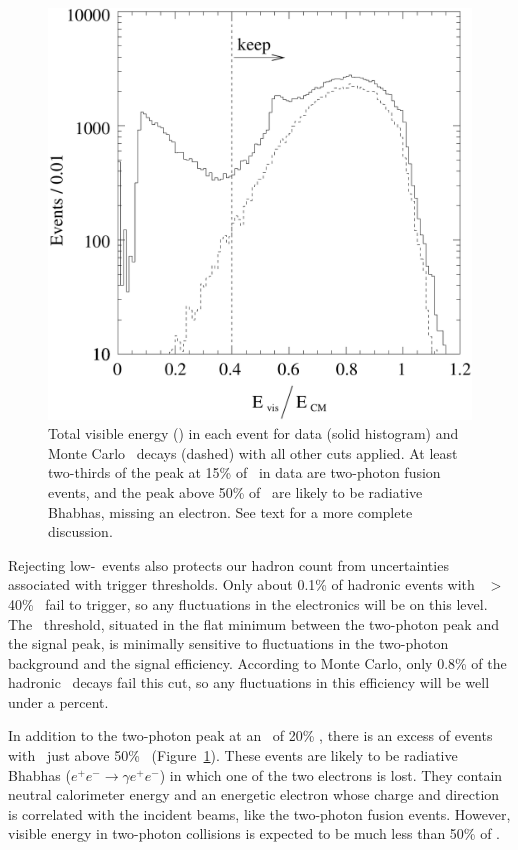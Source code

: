 \documentclass{cornell}
\begin{document}
\begin{figure}[p]
  \begin{center}
    \includegraphics[width=\linewidth]{plots/visen}
  \end{center}
  \caption{\label{visen} Total visible energy (\visen) in each event
  for data (solid histogram) and Monte Carlo \ups\ decays (dashed)
  with all other cuts applied.  At least two-thirds of the peak at
  15\% of \ecm\ in data are two-photon fusion events, and the peak
  above 50\% of \ecm\ are likely to be radiative Bhabhas, missing an
  electron.  See text for a more complete discussion.}
\end{figure}

Rejecting low-\visen\ events also protects our hadron count from
uncertainties associated with trigger thresholds.  Only about 0.1\% of
hadronic events with \visen\ $>$ 40\% \ecm\ fail to trigger, so any
fluctuations in the electronics will be on this level.  The \visen\
threshold, situated in the flat minimum between the two-photon peak
and the signal peak, is minimally sensitive to fluctuations in the
two-photon background and the signal efficiency.  According to Monte
Carlo, only 0.8\% of the hadronic \ups\ decays fail this cut, so any
fluctuations in this efficiency will be well under a percent.

In addition to the two-photon peak at an \visen\ of 20\% \ecm, there
is an excess of events with \visen\ just above 50\% \ecm\ (Figure~\ref{visen}).  These events are likely to be radiative Bhabhas
($e^+e^- \to \gamma e^+e^-$) in which one of the two electrons is
lost.  They contain neutral calorimeter energy and an energetic
electron whose charge and direction is correlated with the incident
beams, like the two-photon fusion events.  However, visible energy in
two-photon collisions is expected to be much less than 50\% of \ecm.
\end{document}
